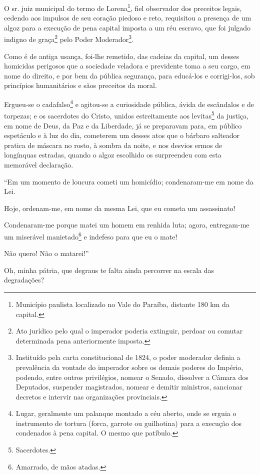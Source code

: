 \asterisc{}

O sr. juiz municipal do termo de Lorena\footnote{Município paulista
  localizado no Vale do Paraíba, distante 180 km da capital.}, fiel
observador dos preceitos legais, cedendo aos impulsos de seu coração
piedoso e reto, requisitou a presença de um algoz para a execução de
pena capital imposta a um réu escravo, que foi julgado indigno de
graça\footnote{Ato jurídico pelo qual o imperador poderia extinguir,
  perdoar ou comutar determinada pena anteriormente imposta.} pelo Poder
Moderador\footnote{Instituído pela carta constitucional de 1824, o
  poder moderador definia a prevalência da vontade do imperador sobre os
  demais poderes do Império, podendo, entre outros privilégios, nomear o
  Senado, dissolver a Câmara dos Deputados, suspender magistrados,
  nomear e demitir ministros, sancionar decretos e intervir nas
  organizações provinciais.}.

Como é de antiga usança, foi-lhe remetido, das cadeias da capital, um
desses homicidas perigosos que a sociedade veladora e previdente toma a
seu cargo, em nome do direito, e por bem da pública segurança, para
educá-los e corrigi-los, sob princípios humanitários e sãos preceitos da
moral.

Ergueu-se o cadafalso\footnote{Lugar, geralmente um palanque montado a
  céu aberto, onde se erguia o instrumento de tortura (forca, garrote ou
  guilhotina) para a execução dos condenados à pena capital. O mesmo que
  patíbulo.} e agitou-se a curiosidade pública, ávida de escândalos e de
torpezas; e os sacerdotes do Cristo, unidos estreitamente aos
levitas\footnote{Sacerdotes.} da justiça, em nome de Deus, da Paz e da
Liberdade, já se preparavam para, em público espetáculo e à luz do dia,
cometerem um desses atos que o bárbaro salteador pratica de máscara no
rosto, à sombra da noite, e nos desvios ermos de longínquas estradas,
quando o algoz escolhido os surpreendeu com esta memorável declaração.

``Em um momento de loucura cometi um homicídio; condenaram-me em nome da
Lei.

Hoje, ordenam-me, em nome da mesma Lei, que eu cometa um assassinato!

Condenaram-me porque matei um homem em renhida luta; agora, entregam-me
um miserável manietado\footnote{Amarrado, de mãos atadas.} e indefeso
para que eu o mate!

Não quero! Não o matarei!''

Oh, minha pátria, que degraus te falta ainda percorrer na escala das
degradações?

